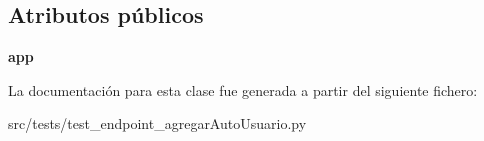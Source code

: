 \subsection*{Atributos públicos}
\begin{DoxyCompactItemize}
\item 
\hypertarget{classsrc_1_1tests_1_1test__endpoint__agregar_auto_usuario_1_1_test_endpoint_agregar_auto_usuario_ae6c82cc1c1576393ebf5710ac53bd680}{{\bfseries app}}\label{classsrc_1_1tests_1_1test__endpoint__agregar_auto_usuario_1_1_test_endpoint_agregar_auto_usuario_ae6c82cc1c1576393ebf5710ac53bd680}

\end{DoxyCompactItemize}


La documentación para esta clase fue generada a partir del siguiente fichero\-:\begin{DoxyCompactItemize}
\item 
src/tests/test\-\_\-endpoint\-\_\-agregar\-Auto\-Usuario.\-py\end{DoxyCompactItemize}
